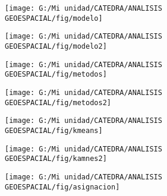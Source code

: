 \documentclass[14pt]{beamer}
\begin{document}
\begin{frame}
  \begin{figure}
    \centering
    \texttt{[image: G:/Mi unidad/CATEDRA/ANALISIS GEOESPACIAL/fig/modelo]}
  \end{figure}
\tiny{}
\end{frame}
\begin{frame}
  \begin{figure}
    \centering
    \texttt{[image: G:/Mi unidad/CATEDRA/ANALISIS GEOESPACIAL/fig/modelo2]}
  \end{figure}
\tiny{}
\end{frame}
\begin{frame}
  \begin{figure}
    \centering
    \texttt{[image: G:/Mi unidad/CATEDRA/ANALISIS GEOESPACIAL/fig/metodos]}
  \end{figure}
\tiny{}
\end{frame}
\begin{frame}
  \begin{figure}
    \centering
    \texttt{[image: G:/Mi unidad/CATEDRA/ANALISIS GEOESPACIAL/fig/metodos2]}
  \end{figure}
\tiny{}
\end{frame}
\begin{frame}
  \begin{figure}
    \centering
    \texttt{[image: G:/Mi unidad/CATEDRA/ANALISIS GEOESPACIAL/fig/kmeans]}
  \end{figure}
\tiny{}
\end{frame}
\begin{frame}
  \begin{figure}
    \centering
    \texttt{[image: G:/Mi unidad/CATEDRA/ANALISIS GEOESPACIAL/fig/kamnes2]}
  \end{figure}
\tiny{}
\end{frame}
\begin{frame}
  \begin{figure}
    \centering
    \texttt{[image: G:/Mi unidad/CATEDRA/ANALISIS GEOESPACIAL/fig/asignacion]}
  \end{figure}
\tiny{}
\end{frame}
\end{document}
